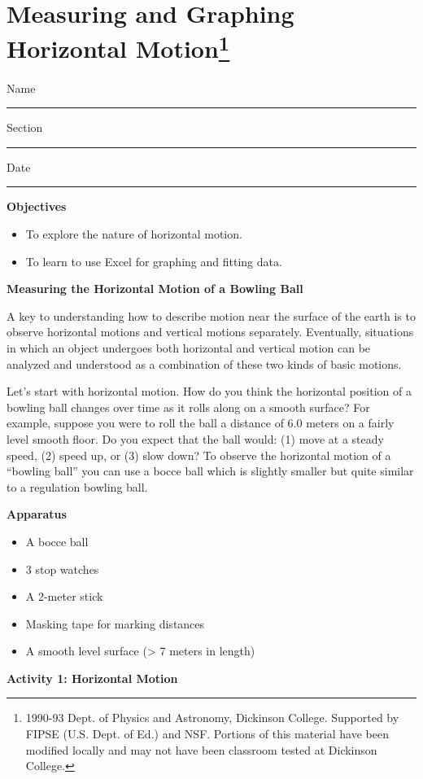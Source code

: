 
\section{Measuring and Graphing Horizontal Motion\footnote{
1990-93 Dept. of Physics and Astronomy, Dickinson College. Supported by FIPSE
(U.S. Dept. of Ed.) and NSF. Portions of this material have been modified locally
and may not have been classroom tested at Dickinson College.
}}

{\par\centering Name \rule{2.0in}{0.1pt}\hfill{}Section \rule{1.0in}{0.1pt}\hfill{}Date
\rule{1.0in}{0.1pt}\par}

\textbf{Objectives} 

\begin{itemize}
\item To explore the nature of horizontal motion. 
\item To learn to use Excel for graphing and fitting data.
\end{itemize}
\textbf{Measuring the Horizontal Motion of a Bowling Ball} 

A key to understanding how to describe motion near the surface of the earth
is to observe horizontal motions and vertical motions separately. Eventually,
situations in which an object undergoes both horizontal and vertical motion
can be analyzed and understood as a combination of these two kinds of basic
motions.

Let's start with horizontal motion. How do you think the horizontal position
of a bowling ball changes over time as it rolls along on a smooth surface? For
example, suppose you were to roll the ball a distance of 6.0 meters on a fairly
level smooth floor. Do you expect that the ball would: (1) move at a steady
speed, (2) speed up, or (3) slow down? To observe the horizontal motion of a
``bowling ball'' you can use a bocce ball which is slightly
smaller but quite similar to a regulation bowling ball.

\textbf{Apparatus} 

\begin{itemize}
\item A bocce ball 
\item 3 stop watches 
\item A 2-meter stick 
\item Masking tape for marking distances 
\item A smooth level surface (> 7 meters in length)
\end{itemize}
\textbf{Activity 1: Horizontal Motion }

